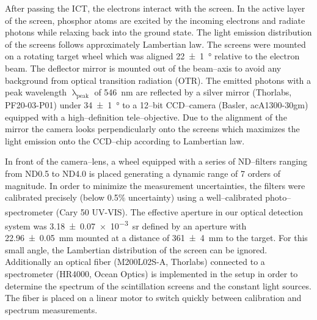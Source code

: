 \documentclass[%
preprint,
amsmath,
amssymb,
aip,
rsi, 
numerical,
floatfix,
]{revtex4-1}
\newcommand{\myCite}[1]{\textcolor{blue}{\cite{#1}}}
\begin{document}
After passing the ICT, the electrons interact with the screen. 
In the active layer of the screen, phosphor atoms are excited by the incoming electrons and radiate photons while relaxing back into the ground state.
The light emission distribution of the screens follows approximately Lambertian law\myCite{Giakoumakis1985}. 
The screens were mounted on a rotating target wheel which was aligned \SI[separate-uncertainty = true]{22(1)}{\degree} relative to the electron beam.
The deflector mirror is mounted out of the beam--axis to avoid any background from optical transition radiation (OTR).  
The emitted photons with a peak wavelength $\uplambda_{\text{peak}}$ of \SI{546}{\nano\metre} are reflected by a silver mirror (Thorlabs, PF20-03-P01) under \SI[separate-uncertainty = true]{34(1)}{\degree} to a 12--bit CCD--camera (Basler, acA1300-30gm) equipped with a high--definition tele--objective. 
Due to the alignment of the mirror the camera looks perpendicularly onto the screens which maximizes the light emission onto the CCD--chip according to Lambertian law.
 
In front of the camera--lens, a wheel equipped with a series of ND--filters ranging from ND0.5 to ND4.0 is placed generating a dynamic range of 7 orders of magnitude. 
In order to minimize the measurement uncertainties, the filters were calibrated precisely (below 0.5$\%$ uncertainty) using a well--calibrated photo--spectrometer (Cary\textsuperscript{\textregistered} 50 UV-VIS).
The effective aperture in our optical detection system was \SI[separate-uncertainty = true]{3.18(7)e-3}{\steradian} defined by an aperture with \SI[separate-uncertainty = true]{22.96(5)}{\milli\metre} mounted at a distance of \SI[separate-uncertainty = true]{361(4)}{\milli\metre} to the target.
For this small angle, the Lambertian distribution of the screen can be ignored.
Additionally an optical fiber (M200L02S-A, Thorlabs) connected to a spectrometer (HR4000, Ocean Optics) is implemented in the setup in order to determine the spectrum of the scintillation screens and the constant light sources.
The fiber is placed on a linear motor to switch quickly between calibration and spectrum measurements. 
 
\end{document}
